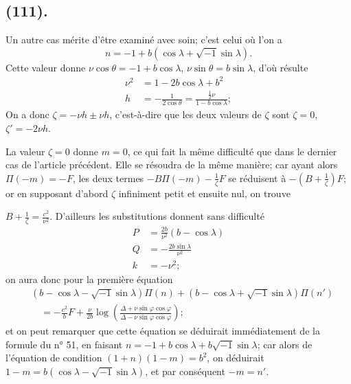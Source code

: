 \documentclass{article}
\begin{document}
\subsection*{(111).}

Un autre cas mérite d'être examiné avec soin; c'est celui où l'on a
\[ n=-1+b(\cos\lambda+\sqrt{-1}\sin\lambda). \]
Cette valeur donne $\nu\cos\theta=-1+b\cos\lambda$, $\nu\sin\theta=b\sin\lambda$, d'où résulte
\[ \begin{aligned} \nu^{2}&=1-2b\cos\lambda+b^{2}\\ h&=-\frac{1}{2\cos\theta}=\frac{\frac{1}{2}\nu}{1-b\cos\lambda}; \end{aligned} \]
On a donc $\zeta=-\nu h\pm\nu h$, c'est-à-dire que les deux valeurs de $\zeta$ sont $\zeta=0$, $\zeta'=-2\nu h$.

La valeur $\zeta=0$ donne $m=0$, ce qui fait la même difficulté que dans le dernier cas de l'article précédent. Elle se résoudra de la même manière; car ayant alors $\Pi(-m)=-F$, les deux termes $-B\Pi(-m)-\frac{1}{\zeta}F$ se réduisent à $-\left(B+\frac{1}{\zeta}\right)F$; or en supposant d'abord $\zeta$ infiniment petit et ensuite nul, on trouve

$B+\frac{1}{\zeta}=\frac{c^{2}}{\nu^{2}}$. D'ailleurs les substitutions donnent sans difficulté
\[ \begin{aligned} P&=\frac{2b}{\nu^{2}}(b-\cos\lambda)\\ Q&=-\frac{2b\sin\lambda}{\nu^{2}}\\ k&=-\nu^{2}; \end{aligned} \]
on aura donc pour la première équation
\[ \begin{aligned} &(b-\cos\lambda-\sqrt{-1}\sin\lambda)\Pi(n)+(b-\cos\lambda+\sqrt{-1}\sin\lambda)\Pi(n')\\ &\quad=-\frac{c^{2}}{b}F+\frac{\nu}{2b}\log\left(\frac{\Delta+\nu\sin\varphi\cos\varphi}{\Delta-\nu\sin\varphi\cos\varphi}\right); \end{aligned} \]
et on peut remarquer que cette équation se déduirait immédiatement de la formule du n° 51, en faisant $n=-1+b\cos\lambda+b\sqrt{-1}\sin\lambda$; car alors de l'équation de condition $(1+n)(1-m)=b^{2}$, on déduirait $1-m=b(\cos\lambda-\sqrt{-1}\sin\lambda)$, et par conséquent $-m=n'$.
\end{document}
